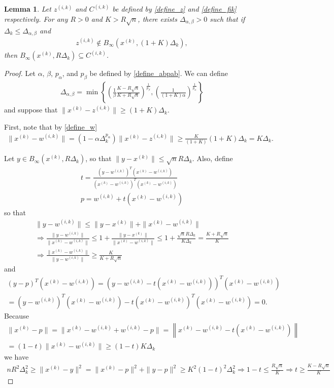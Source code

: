\documentclass{article}
\newtheorem{lemma}[theorem]{Lemma}
\theoremstyle{case}
\numberwithin{theorem}{subsection}
\newcommand{\deltalargzik}{{\Delta_{\alpha,\beta}}}
\newcommand{\dk}{\Delta_k}
\newcommand{\wik}{{w^{(i, k)}}}
\newcommand{\xk}{x^{(k)}}
\newcommand{\zik}{{z^{(i, k)}}}
\newcommand{\fik}{{C^{(i, k)}}}
\begin{document}
\begin{lemma}
\label{large_zik_means_means_no_intersection}
Let
$\zik$ and $\fik$
be defined by
\cref{define_z} and \cref{define_fik} respectively.
For any $R > 0$ and $K > R\sqrt{n}$, there exists $\deltalargzik > 0$ such that if $\dk \le \deltalargzik$ and 
\begin{align*}
\zik \not \in B_{\infty}\left(\xk, (1+K) \dk\right),
\end{align*}
then $B_{\infty}\left(\xk, R \dk\right) \subseteq \fik$.
\end{lemma}
\begin{proof}
Let $\alpha$, $\beta$, $p_{\alpha}$, and $p_{\beta}$ be defined by \cref{define_abpab}.
We can define
\begin{align}
\deltalargzik = \min\left\{
\left(\frac 1 {\beta }\frac {K - R\sqrt{n}}{K + R\sqrt{n}}\right)^{\frac 1 {p_{\beta }}},
\left(\frac 1 {(1+K)\alpha}\right)^{\frac 1 {p_{\alpha}}}
\right\} \label{define_deltalargzik}
\end{align}
and suppose that $\|\xk - \zik\| \ge (1+K) \dk$.

First, note that by \cref{define_w}
\begin{align*}
\|\xk - \wik\| = (1 - \alpha\dk^{p_{\alpha}}) \|\xk - \zik\| \ge \frac {K} {(1+K)} (1+K)\dk = K\dk.
\end{align*}

Let $y \in B_{\infty}\left(\xk, R \dk\right)$, so that $\|y - \xk\| \le \sqrt{n}R\dk$.
Also, define
\begin{align*}
t  = \frac{(y - \wik)^T(\xk - \wik)}{\left(\xk - \wik\right)^T(\xk - \wik)} \\
p = \wik + t\left(\xk - \wik\right)
\end{align*}
so that
\begin{align*}
\|y - \wik\| \le \|y - \xk\| + \|\xk - \wik\| \\
\Longrightarrow \frac{\|y - \wik\|}{\|\xk - \wik\|} \le 1 +  \frac{\|y - \xk\|}{\|\xk - \wik\|} 
\le 1 + \frac{\sqrt{n}R\dk}{K \dk} = \frac {K+R\sqrt{n}}{K} \\
\Longrightarrow \frac{\|\xk - \wik\|}{\|y - \wik\|} \ge \frac {K}{K+R\sqrt{n}}
\end{align*}
and
\begin{align*}
\left(y - p\right)^T\left(\xk - \wik\right) = 
\left(y - \wik - t\left(\xk - \wik\right)\right)^T\left(\xk - \wik\right) \\
= \left(y - \wik\right)^T\left(\xk - \wik\right) - t\left(\xk - \wik\right)^T\left(\xk - \wik\right) = 0.
\end{align*}
Because
\begin{align*}
\|\xk - p\| = \|\xk - \wik + \wik - p\| = \left\|\xk - \wik - t\left(\xk - \wik\right)\right\| \\
= (1-t)\|\xk - \wik\| \ge (1-t)K\dk
\end{align*}
we have
\begin{align*}
nR^2\dk^2 \ge \|\xk - y\|^2 = \|\xk - p\|^2 + \|y - p\|^2 \ge K^2(1-t)^2\dk^2 
\Longrightarrow 1-t \le \frac {R\sqrt{n}} {K} 
\Longrightarrow t \ge \frac {K - R\sqrt{n}}{K}
\end{align*}


\end{proof}
\end{document}
